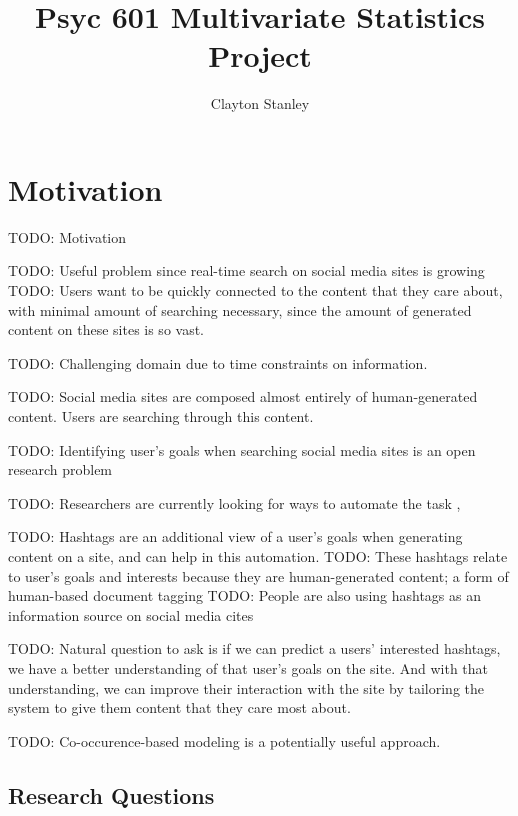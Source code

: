 \documentclass[man]{apa6}
\title{Psyc 601 Multivariate Statistics Project}
\author{Clayton Stanley}
\affiliation{Rice University}
\begin{document}
\maketitle

\tableofcontents
\newpage

\section{Motivation}

TODO: Motivation

TODO: Useful problem since real-time search on social media sites is growing \cite{Jansen2011}
TODO: Users want to be quickly connected to the content that they care about, with minimal amount of searching necessary, since the amount of generated content on these sites is so vast.

TODO: Challenging domain due to time constraints on information. \cite{Bauer2012}

TODO: Social media sites are composed almost entirely of human-generated content.
Users are searching through this content.

TODO: Identifying user's goals when searching social media sites is an open research problem \cite{Rose2004}

TODO: Researchers are currently looking for ways to automate the task \cite{Lee2005}, \cite{Jansen2008}

TODO: Hashtags are an additional view of a user's goals when generating content on a site, and can help in this automation.
TODO: These hashtags relate to user's goals and interests because they are human-generated content; a form of human-based document tagging \cite{Chang2010}
TODO: People are also using hashtags as an information source on social media cites \cite{Diakopoulos2010} \cite{Kwak2010}

TODO: Natural question to ask is if we can predict a users' interested hashtags, we have a better understanding of that user's goals on the site.
And with that understanding, we can improve their interaction with the site by tailoring the system to give them content that they care most about.

TODO: Co-occurence-based modeling is a potentially useful approach. \cite{Efron2010}

\subsection{Research Questions}
\end{document}
